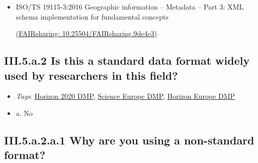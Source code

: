 \documentclass[a4paper,12pt]{report}
\begin{document}
\begin{itemize}
  \item[\CheckmarkBold]
  \begin{markdown}
  ISO/TS 19115-3:2016 Geographic information -- Metadata -- Part 3: XML schema implementation for fundamental concepts
  \end{markdown}
  \href{https://fairsharing.org/10.25504/FAIRsharing.9de4c3}{(FAIRsharing: 10.25504/FAIRsharing.9de4c3)}
  
\end{itemize}


\subsection*{\protect\textcolor{colorSecId}{III.5.a.2} Is this a standard data format widely used by researchers in this field?}

\label{b1df3c74-0b1f-4574-81c4-4cc2d780c1af.b08fe063-33f8-4380-b3a9-ba1e586dedf2.60574746-e0ce-44c6-8095-a4ed4ebf8d54.ecff019a-d4e6-44c6-a8fe-c84eb15ed8b7}


\begin{itemize}
  \item \textit{Tags}: \ul{Horizon 2020 DMP}, \ul{Science Europe DMP}, \ul{Horizon Europe DMP}
  \end{itemize}




\begin{itemize}
  \item[\CheckmarkBold] a. No
\end{itemize}




\subsection*{\protect\textcolor{colorSecId}{III.5.a.2.a.1} Why are you using a non-standard format?}

\label{b1df3c74-0b1f-4574-81c4-4cc2d780c1af.b08fe063-33f8-4380-b3a9-ba1e586dedf2.60574746-e0ce-44c6-8095-a4ed4ebf8d54.ecff019a-d4e6-44c6-a8fe-c84eb15ed8b7.52b7aba3-d809-4a30-b3f8-90caa7a32a10.8bd3d76a-4f69-4a1e-82dd-5416739720b3}
\end{document}
